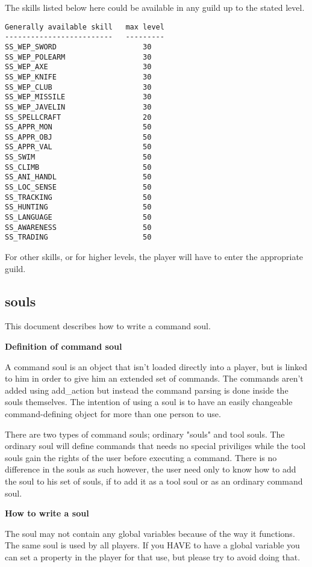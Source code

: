 The skills listed below here could be available in any guild up to the 
stated level. 

\begin{verbatim}
Generally available skill   max level
-------------------------   ---------
SS_WEP_SWORD                    30
SS_WEP_POLEARM                  30
SS_WEP_AXE                      30
SS_WEP_KNIFE                    30
SS_WEP_CLUB                     30
SS_WEP_MISSILE                  30
SS_WEP_JAVELIN                  30
SS_SPELLCRAFT                   20
SS_APPR_MON                     50
SS_APPR_OBJ                     50          
SS_APPR_VAL                     50
SS_SWIM                         50
SS_CLIMB                        50
SS_ANI_HANDL                    50
SS_LOC_SENSE                    50
SS_TRACKING                     50
SS_HUNTING                      50
SS_LANGUAGE                     50
SS_AWARENESS                    50
SS_TRADING                      50
\end{verbatim}

For other skills, or for higher levels, the player will have to enter the
appropriate guild.


\subsection{souls}

This document describes how to write a command soul.

{\bf Definition of command soul}

A command soul is an object that isn't loaded directly into a player,
but is linked to him in order to give him an extended set of commands.
The commands aren't added using add\_action but instead the command
parsing is done inside the souls themselves. The intention of using a
soul is to have an easily changeable command-defining object for more
than one person to use. 

There are two types of command souls; ordinary "souls" and tool souls.
The ordinary soul will define commands that needs no special priviliges 
while the tool souls gain the rights of the user before executing a 
command. There is no difference in the souls as such however, the user
need only to know how to add the soul to his set of souls, if to add it
as a tool soul or as an ordinary command soul.

{\bf How to write a soul}

The soul may not contain any global variables because of the way it 
functions. The same soul is used by all players. If you HAVE to have
a global variable you can set a property in the player for that use, 
but please try to avoid doing that.

